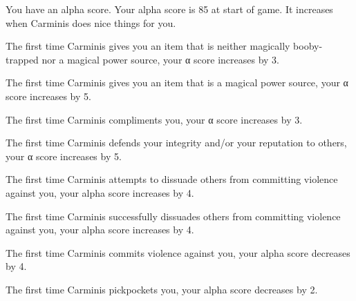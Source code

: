 \documentclass[green]{Sel}
\begin{document}
\name{\gTyranSoulBond{}}

You have an alpha score. Your alpha score is 85 at start of game. It increases when Carminis does nice things for you.

The first time Carminis gives you an item that is neither magically booby-trapped nor a magical power source, your α score increases by 3.

The first time Carminis gives you an item that is a magical power source, your α score increases by 5.

The first time Carminis compliments you, your α score increases by 3.

The first time Carminis defends your integrity and/or your reputation to others, your α score increases by 5.

The first time Carminis attempts to dissuade others from committing violence against you, your alpha score increases by 4.

The first time Carminis successfully dissuades others from committing violence against you, your alpha score increases by 4.

The first time Carminis commits violence against you, your alpha score decreases by 4.

The first time Carminis pickpockets you, your alpha score decreases by 2.
\end{document}
